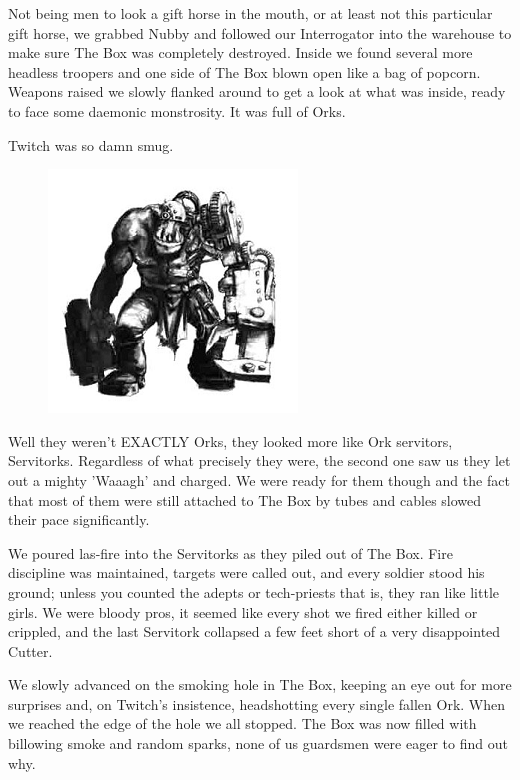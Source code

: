 Not being men to look a gift horse in the mouth, or at least not this particular gift horse, we grabbed Nubby and followed our Interrogator into the warehouse to make sure The Box was completely destroyed. 
Inside we found several more headless troopers and one side of The Box blown open like a bag of popcorn. 
Weapons raised we slowly flanked around to get a look at what was inside, ready to face some daemonic monstrosity. 
It was full of Orks.

Twitch was so damn smug.

\begin{figure}
	\begin{center}
		\includegraphics[width=\figwidth]{pics/4/27.png}
	\end{center}
\end{figure}
Well they weren't EXACTLY Orks, they looked more like Ork servitors, Servitorks. 
Regardless of what precisely they were, the second one saw us they let out a mighty 'Waaagh' and charged. 
We were ready for them though and the fact that most of them were still attached to The Box by tubes and cables slowed their pace significantly.

We poured las-fire into the Servitorks as they piled out of The Box. 
Fire discipline was maintained, targets were called out, and every soldier stood his ground;
unless you counted the adepts or tech-priests that is, they ran like little girls. 
We were bloody pros, it seemed like every shot we fired either killed or crippled, and the last Servitork collapsed a few feet short of a very disappointed Cutter.

We slowly advanced on the smoking hole in The Box, keeping an eye out for more surprises and, on Twitch's insistence, headshotting every single fallen Ork. 
When we reached the edge of the hole we all stopped. 
The Box was now filled with billowing smoke and random sparks, none of us guardsmen were eager to find out why. 

